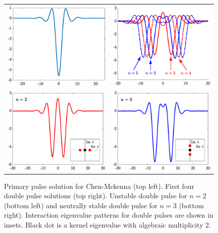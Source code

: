 \documentclass[12pt,reqno,oneside,hidelinks]{article}
\begin{document}
\begin{figure}
    \centering
    \begin{tabular}{cc}
        \includegraphics[width=7cm]{images/chen1p.eps} &
        \includegraphics[width=7cm]{images/chenDPall.eps} \\
        \includegraphics[width=7cm]{images/chen2punstable.eps} &
        \includegraphics[width=7cm]{images/chen2pstable.eps} 
    \end{tabular}
    \caption{Primary pulse solution for Chen-Mckenna (top left). First four double pulse solutions (top right). Unstable double pulse for $n=2$ (bottom left) and neutrally stable double pulse for $n=3$ (bottom right). Interaction eigenvalue patterns for double pulses are shown in insets. Black dot is a kernel eigenvalue with algebraic multiplicity 2.}
    \label{fig:chen2p}
\end{figure}
\end{document}
